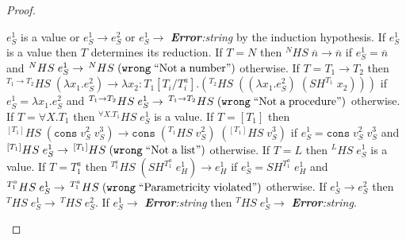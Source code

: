 \begin{theorem}
\begin{proof}
\begin{case}
$e_{S}^{1}$ is a value or $e_{S}^{1}\rightarrow e_{S}^{2}$ or $e_{S}^{1}\rightarrow$ \emph{\textbf{Error}:\;string} by the induction hypothesis.  If $e_{S}^{1}$ is a value then $T$ determines its reduction.  If $T=N$ then $^{N}HS\;\overline{n}\rightarrow\overline{n}$ if $e_{S}^{1}=\overline{n}$ and $^{N}HS\;e_{S}^{1}\rightarrow\,^{N}HS\;(\mathtt{wrong}\;\mathrm{``Not\;a\;number"})$ otherwise.  If $T=T_{1}\rightarrow T_{2}$ then $^{T_{1}\rightarrow T_{2}}HS\;(\lambda x_{1}.e_{S}^{2})\rightarrow\lambda x_{2}:T_{1}[T_{i}/T^{a}_{i}].(^{T_{2}}HS\;((\lambda x_{1}.e_{S}^{2})\;(SH^{T_{1}}\;x_{2})))$ if $e_{S}^{1}=\lambda x_{1}.e_{S}^{2}$ and $^{T_{1}\rightarrow T_{2}}HS\;e_{S}^{1}\rightarrow\,^{T_{1}\rightarrow T_{2}}HS\;(\mathtt{wrong}\;\mathrm{``Not\;a\;procedure"})$ otherwise.  If $T=\forall X.T_{1}$ then $^{\forall X.T_{1}}HS\;e_{S}^{1}$ is a value.  If $T=[T_{1}]$ then $^{[T_{1}]}HS\;(\mathtt{cons}\;v_{S}^{2}\;v_{S}^{3})\rightarrow\mathtt{cons}\;(^{T_{1}}HS\;v_{S}^{2})\;(^{[T_{1}]}HS\;v_{S}^{3})$ if $e_{S}^{1}=\mathtt{cons}\;v_{S}^{2}\;v_{S}^{3}$ and $^{[T_{1}]}HS\;e_{S}^{1}\rightarrow\,^{[T_{1}]}HS\;(\mathtt{wrong}\;\mathrm{``Not\;a\;list"})$ otherwise.  If $T=L$ then $^{L}HS\;e_{S}^{1}$ is a value.
If $T=T_{1}^{a}$ then $^{T_{1}^{a}}HS\;(SH^{T_{1}^{a}}\;e_{H}^{1})\rightarrow e_{H}^{1}$ if $e_{S}^{1}=SH^{T_{1}^{a}}\;e_{H}^{1}$ and $^{T_{1}^{a}}HS\;e_{S}^{1}\rightarrow\,^{T_{1}^{a}}HS\;(\mathtt{wrong}\;\mathrm{``Parametricity\;violated"})$ otherwise.  If $e_{S}^{1}\rightarrow e_{S}^{2}$ then $^{T}HS\;e_{S}^{1}\rightarrow\,^{T}HS\;e_{S}^{2}$.  If $e_{S}^{1}\rightarrow$ \emph{\textbf{Error}:\;string} then $^{T}HS\;e_{S}^{1}\rightarrow$ \emph{\textbf{Error}:\;string}.
\end{case}
\end{proof}
\end{theorem}